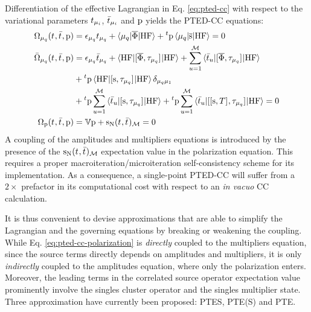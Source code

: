 Differentiation of the effective Lagrangian in Eq. \eqref{eq:pted-cc}
with respect to the variational parameters $t_{\mu_i}$,
$\bar{t}_{\mu_i}$ and $\mathrm{p}$ yields the \acrshort{PTED}-\acrshort{CC}
equations:
\begin{subequations}\label{eq:pted}
  \begin{align}
   \Omega_{\mu_q}(t_{}, \bar{t}_{}, \mathrm{p})  &=
   \epsilon_{\mu_q}t_{\mu_q} + \braket{\mu_q | \overline{\Phi} | \mathrm{HF}}
   + {}^t\mathrm{p}\braket{\mu_q | \overline{\mathrm{s}} | \mathrm{HF}}
             = 0 \label{eq:pted-cc-amplitudes}\\
   \bar{\Omega}_{\mu_q}(t_{}, \bar{t}_{}, \mathrm{p})
    &=
    \epsilon_{\mu_q}\bar{t}_{\mu_q} +
    \braket{\mathrm{HF} | [ \overline{\Phi}, \tau_{\mu_q} ]^{} | \mathrm{HF}} +
    \sum_{u=1}^{\mathcal{M}}\braket{\bar{t}_{u} |
    [ \overline{\Phi}, \tau_{\mu_q} ]^{} | \mathrm{HF}}
    \nonumber \\
    &+
    {}^t\mathrm{p}\braket{\mathrm{HF} | [ \mathrm{s}, \tau_{\mu_q} ]^{} | \mathrm{HF}}\delta_{\mu_q\mu_1} \nonumber \\
    &+
    {}^t\mathrm{p}\sum_{u=1}^{\mathcal{M}}\braket{\bar{t}_{u} | [ \mathrm{s}, \tau_{\mu_q} ]^{} | \mathrm{HF}}
    +
    {}^t\mathrm{p}\sum_{u=1}^{\mathcal{M}}\braket{\bar{t}_{u} | [ [ \mathrm{s}, T ]^{}, \tau_{\mu_q} ]^{} | \mathrm{HF}}
             = 0 \label{eq:pted-cc-multipliers}\\
    \Omega_{\mathrm{p}}(t_{}, \bar{t}_{}, \mathrm{p})
    &=
    \mathbb{V}\mathrm{p} + \mathrm{s}_{\mathrm{N}}(t_{}, \bar{t}_{})_\mathcal{M} = 0
    \label{eq:pted-cc-polarization}
  \end{align}
\end{subequations}
A coupling of the amplitudes and multipliers equations is introduced by
the presence of the $\mathrm{s}_{\mathrm{N}}(t_{}, \bar{t}_{})_\mathcal{M}$ expectation value
in the polarization equation.
This requires a proper macroiteration/microiteration self-consistency
scheme for its implementation.\autocite{Cammi2009-gu, Caricato2010-hx}
As a consequence, a single-point \acrshort{PTED}-\acrshort{CC} will suffer from a
$2\times$ prefactor in its computational cost with respect to an
\emph{in vacuo} \acrshort{CC} calculation.

It is thus convenient to devise approximations that are able to simplify the
Lagrangian and the governing equations by breaking or weakening the coupling.
While Eq. \eqref{eq:pted-cc-polarization} is \emph{directly} coupled to
the multipliers equation, since the source terms directly depends on
amplitudes and multipliers, it is only \emph{indirectly} coupled to the
amplitudes equation, where only the polarization enters.
Moreover, the leading terms in the correlated source operator
expectation value prominently involve the
singles cluster operator and the singles multiplier state.
Three approximation have currently been proposed: \gls{PTES}, \gls{PTE(S)}
and \gls{PTE}.

